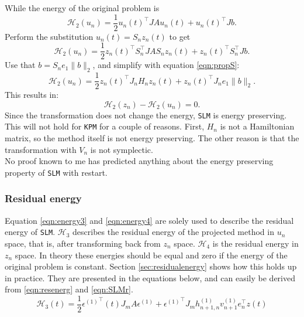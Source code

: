 \noindent While the energy of the original problem is 
\begin{equation*}
\mathcal{H}_2(u_n) = \frac{1}{2}u_n(t)^\top J A u_n(t) + u_n(t)^\top J b.
\end{equation*}
Perform the substitution $ u_n(t) = S_n z_n(t) $ to get
\begin{equation*}
\mathcal{H}_2(u_n) = \frac{1}{2}z_n(t)^\top S_n^\top J A S_n z_n(t) + z_n(t)^\top S_n^\top J b.
\end{equation*}
Use that $ b = S_n e_1 \| b \|_2 $, and simplify with equation \eqref{eqn:propS}:
\begin{equation*}
\mathcal{H}_2(u_n) = \frac{1}{2}z_n(t)^\top J_n H_n z_n(t) + z_n(t)^\top J_n e_1 \|b \|_2.
\end{equation*}
This results in: 
\begin{equation*}
\mathcal{H}_2(z_n) - \mathcal{H}_2(u_n) = 0.
\end{equation*}
Since the transformation does not change the energy, \texttt{SLM} is energy preserving. This will not hold for \texttt{KPM} for a couple of reasons. First, $H_n$ is not a Hamiltonian matrix, so the method itself is not energy preserving. The other reason is that the transformation with $V_n$ is not symplectic.\\ 
No proof known to me has predicted anything about the energy preserving property of \texttt{SLM} with restart. %
\subsubsection{Residual energy}
Equation \eqref{eqn:energy3} and \eqref{eqn:energy4} are solely used to describe the residual energy of \texttt{SLM}. $\mathcal{H}_3$ describes the residual energy of the projected method in $u_n$ space, that is, after transforming back from $z_n$ space. $\mathcal{H}_4$ is the residual energy in $z_n$ space. In theory these energies should be equal and zero if the energy of the original problem is constant. Section \ref{sec:residualenergy} shows how this holds up in practice. 
They are presented in the equations below, and can easily be derived from \eqref{eqn:resenerg} and \eqref{eqn:SLMr}. \\
\begin{equation}
\mathcal{H}_3 (t) = \frac{1}{2} {\epsilon^{(1)}}^\top (t) J_m A \epsilon^{(1)} + {\epsilon^{(1)}}^\top J_m h_{n+1,n}^{(1)} v_{n+1}^{(1)} e_n^\top z(t)
\label{eqn:energy3}
\end{equation}

